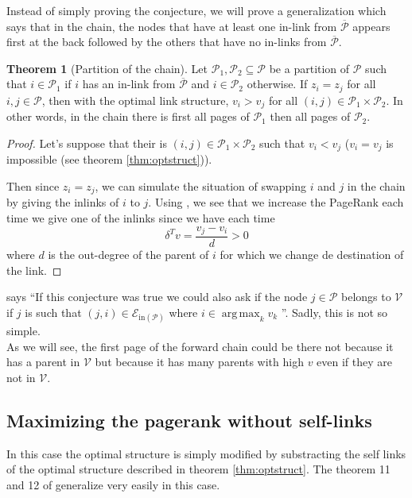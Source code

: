 \documentclass{article}
\DeclareMathOperator*{\argmax}{arg\,max}
\newcommand{\1}{\mathbf{1}}
\theoremstyle{definition}
\newtheorem{mytheo}[mydef]{Theorem}
\begin{document}
Instead of simply proving the conjecture, we will prove a generalization
which says that in the chain, the nodes that have at least one in-link from $\overline{\mathcal{P}}$ appears first at the back
followed by the others that have no in-links from $\overline{\mathcal{P}}$.
\begin{mytheo}[Partition of the chain]
  \label{theo:partition}
  Let \(\mathcal{P}_1,\mathcal{P}_2 \subseteq \mathcal{P}\) be a partition of \(\mathcal{P}\) such that
  \(i \in \mathcal{P}_1\) if \(i\) has an in-link from \(\overline{\mathcal{P}}\) and \(i \in \mathcal{P}_2\)
  otherwise.
  If \(z_i = z_j\) for all \(i,j \in \mathcal{P}\),
  then with the optimal link structure,
  \(v_i > v_j\) for all \((i,j) \in \mathcal{P}_1 \times \mathcal{P}_2\).
  In other words, in the chain there is first all pages of
  \(\mathcal{P}_1\) then all pages of \(\mathcal{P}_2\).
  \begin{proof}
    Let's suppose that their is \((i,j) \in \mathcal{P}_1 \times \mathcal{P}_2\)
    such that \(v_i < v_j\) (\(v_i = v_j\) is impossible (see theorem \ref{thm:optstruct})).

    Then since \(z_i = z_j\), we can simulate the situation of swapping \(i\) and \(j\) in the chain
    by giving the inlinks of \(i\) to \(j\).
    Using \cite[theorem~5]{de2008maximizing}, we see that we increase the PageRank each time we give one of the inlinks since
    we have each time
    \[ \delta^Tv = \frac{v_j - v_i}{d} > 0 \]
    where \(d\) is the out-degree of the parent of \(i\) for which we change de destination of the link.
  \end{proof}
\end{mytheo}

\cite{de2008maximizing} says
``If this conjecture was true we could also ask if the node \(j \in \mathcal{P}\) belongs to \(\mathcal{V}\) if \(j\) is such that
\((j, i) \in \mathcal{E}_{\text{in}(\mathcal{P})}\) where \(i \in \argmax_k v_k\) ''.
Sadly, this is not so simple. \\
As we will see, the first page of the forward chain could be there not
because it has a parent in \(\mathcal{V}\) but because it has many parents with high \(v\) even if they are not in \(\mathcal{V}\).

\subsection{Maximizing the pagerank without self-links}
In this case the optimal structure is simply modified by substracting the self links of the optimal structure described in theorem \ref{thm:optstruct}. The theorem 11 and 12 of \cite{de2008maximizing} generalize very easily in this case.
\end{document}
